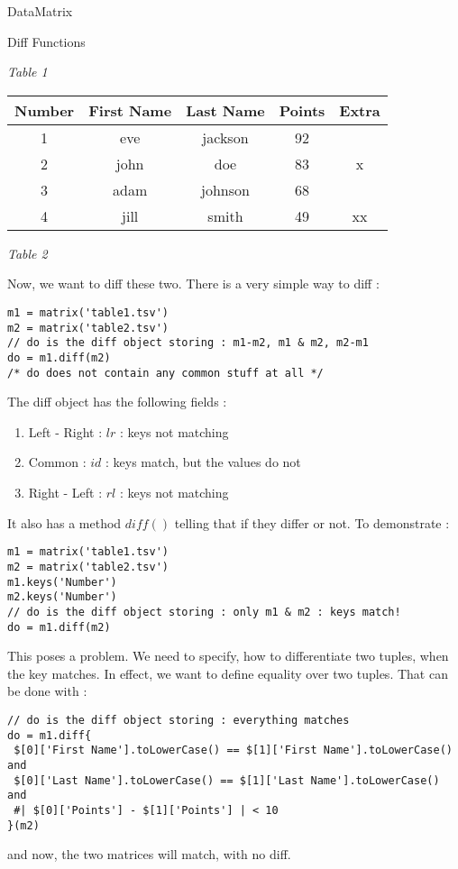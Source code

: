 \begin{section}{DataMatrix}
\begin{subsection}{Diff Functions}
\begin{center}
\emph{ Table 1 }


\begin{tabular}{ |c|c|c|c|c| } 
 \hline
 Number	& First Name & Last Name & Points & Extra \\ 
 \hline 
   1    & eve	     & jackson	& 92      & \\
   2    & john       & doe	    & 83      &  x \\ 
   3    & adam       & johnson	& 68      &  \\	
   4    & jill       & smith	& 49      & xx \\  
 \hline
\end{tabular}

\emph{ Table 2 }

\end{center}

Now, we want to diff these two. There is a very simple way to diff :

\begin{lstlisting}[style=JexlStyle]
m1 = matrix('table1.tsv')
m2 = matrix('table2.tsv')
// do is the diff object storing : m1-m2, m1 & m2, m2-m1 
do = m1.diff(m2)
/* do does not contain any common stuff at all */
\end{lstlisting}

The diff object has the following fields :
\begin{enumerate}
\item{Left - Right : $lr$ : keys not matching }
\item{Common : $id$ : keys match, but the values do not}
\item{Right - Left : $rl$ : keys not matching }
\end{enumerate}
It also has a method $diff()$ telling that if they differ or not. 
To demonstrate :

\begin{lstlisting}[style=JexlStyle]
m1 = matrix('table1.tsv')
m2 = matrix('table2.tsv')
m1.keys('Number')
m2.keys('Number')
// do is the diff object storing : only m1 & m2 : keys match! 
do = m1.diff(m2)
\end{lstlisting}

This poses a problem. We need to specify, how to differentiate two tuples, 
when the key matches. In effect, we want to define equality over two tuples.
That can be done with :

\begin{lstlisting}[style=JexlStyle]
// do is the diff object storing : everything matches 
do = m1.diff{    
 $[0]['First Name'].toLowerCase() == $[1]['First Name'].toLowerCase() and 
 $[0]['Last Name'].toLowerCase() == $[1]['Last Name'].toLowerCase() and 
 #| $[0]['Points'] - $[1]['Points'] | < 10   
}(m2)
\end{lstlisting}
and now, the two matrices will match, with no diff.
\end{subsection}

\end{section}

